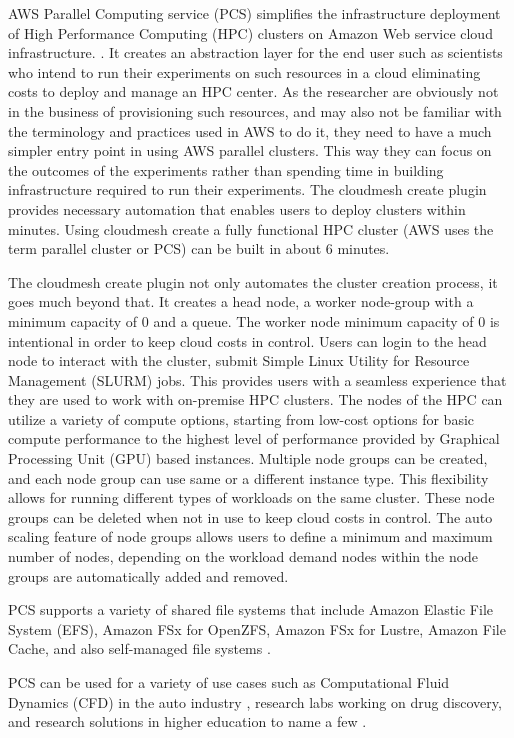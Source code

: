 \documentclass[utf8]{FrontiersinVancouver} %
\begin{document}
AWS Parallel Computing service (PCS) simplifies the infrastructure deployment of High Performance Computing (HPC) clusters on Amazon Web service cloud infrastructure. \citep{awspcs}. It creates an abstraction layer for the end user such as scientists who intend to run their experiments on such resources in a cloud eliminating costs to deploy and manage an HPC center. As the researcher are obviously not in the business of provisioning such resources, and may also not be familiar with the terminology and practices used in AWS to do it, they need to have a much simpler entry point in using AWS parallel clusters.
This way they can focus on the outcomes of the experiments rather than spending time in building infrastructure required to run their experiments. The cloudmesh create plugin provides necessary automation that enables users to deploy clusters within minutes. Using cloudmesh create a fully functional HPC cluster  (AWS uses the term parallel cluster or PCS) can be  built in about 6 minutes. 

The cloudmesh create plugin not only automates the cluster creation process, it goes much beyond that. It creates a head node, a worker node-group with a minimum capacity of 0 and a queue. The worker node minimum capacity of 0 is intentional in order to keep cloud costs in control. Users can login to the head node to interact with the cluster, submit Simple Linux Utility for Resource Management (SLURM) jobs. This provides users with a seamless experience that they are used to work with on-premise HPC clusters. The nodes of the HPC can utilize a variety of compute options, starting from low-cost options for basic compute performance to the highest level of performance provided by Graphical Processing Unit (GPU) based instances. Multiple node groups can be created, and each node group can use same or a different instance type. This flexibility allows for running different types of workloads on the same cluster. These node groups can be deleted when not in use to keep cloud costs in control. The auto scaling feature of node groups allows users to define a minimum and maximum number of nodes, depending on the workload demand nodes within the node groups are automatically added and removed.


PCS supports a variety of shared file systems that include Amazon Elastic File System (EFS), Amazon FSx for OpenZFS, Amazon FSx for Lustre, Amazon File Cache, and also self-managed file systems \citep{awspcsstorage:online}.

PCS can be used for a variety of use cases such as Computational Fluid Dynamics (CFD) in the auto industry \citep{CFD:online}, research labs working on drug discovery, and research solutions in higher education to name a few \citep{awspcsblob1:online}. 
\end{document}
